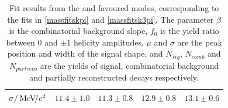 \begin{table}[h]
{{\begin{tabular}{l|cc|cc}
$\sigma/{\mathrm{\,Me\kern -0.1em V\!/}c^2}$ & $11.4 \pm 1.0$ & $11.3 \pm 0.8$ & $12.9 \pm 0.8$ & $13.1 \pm 0.6$ \\
\hline
\end{tabular}}
\label{fitresultsk3pi}}
\caption{Fit results from the \kpi and \kpipipi favoured modes, corresponding to the fits in \figs\ref{massfitskpi} and \ref{massfitsk3pi}. The parameter $\beta$ is the combinatorial background slope, $f_0$ is the yield ratio between 0 and $\pm$1 helicity amplitudes, $\mu$ and $\sigma$ are the peak position and width of the signal shape, and $N_{sig}$, $N_{comb}$ and $N_{partreco}$ are the yields of signal, combinatorial background and partially reconstructed decays respectively.}
\end{table}


\clearpage
